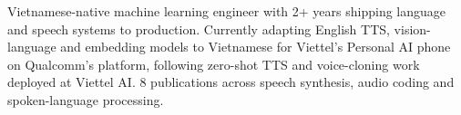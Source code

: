 

\begin{cvparagraph}

Vietnamese-native machine learning engineer with 2+ years shipping language and speech systems to production. Currently adapting English TTS, vision-language and embedding models to Vietnamese for Viettel's Personal AI phone on Qualcomm's platform, following zero-shot TTS and voice-cloning work deployed at Viettel AI. 8 publications across speech synthesis, audio coding and spoken-language processing.

\end{cvparagraph}
